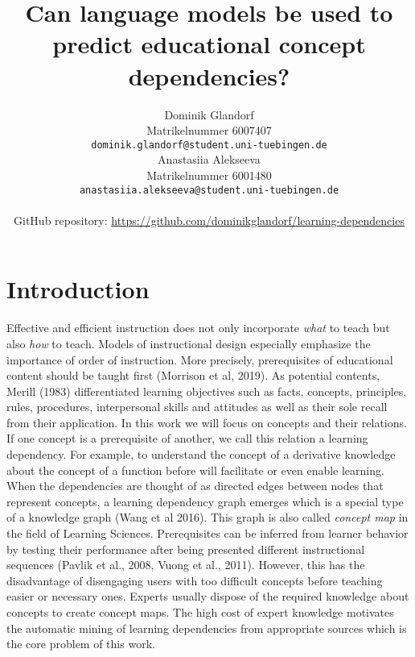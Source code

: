 \documentclass{article}
\title{Can language models be used to predict educational concept dependencies?}
\author{%
  Dominik Glandorf\\
  Matrikelnummer 6007407\\
  \texttt{dominik.glandorf@student.uni-tuebingen.de} \\
  \And
  Anastasiia Alekseeva\\
  Matrikelnummer 6001480\\
  \texttt{anastasiia.alekseeva@student.uni-tuebingen.de} \\
  \\
  GitHub repository: \url{https://github.com/dominikglandorf/learning-dependencies}
}
\begin{document}
\vspace*{-5mm}
\maketitle
\vspace*{-5mm}

\begin{abstract}





\end{abstract}

\section{Introduction}
Effective and efficient instruction does not only incorporate \textit{what} to teach but also \textit{how} to teach. Models of instructional design especially emphasize the importance of order of instruction. More precisely, prerequisites of educational content should be taught first (Morrison et al, 2019).
As potential contents, Merill (1983) differentiated learning objectives such as facts, concepts, principles, rules, procedures, interpersonal skills and attitudes as well as their sole recall from their application. In this work we will focus on concepts and their relations. 
If one concept is a prerequisite of another, we call this relation a learning dependency. For example, to understand the concept of a derivative knowledge about the concept of a function before will facilitate or even enable learning. When the dependencies are thought of as directed edges between nodes that represent concepts, a learning dependency graph emerges which is a special type of a knowledge graph (Wang et al 2016). This graph is also called \textit{concept map} in the field of Learning Sciences.
Prerequisites can be inferred from learner behavior by testing their performance after being presented different instructional sequences (Pavlik et al., 2008, Vuong et al., 2011). However, this has the disadvantage of disengaging users with too difficult concepts before teaching easier or necessary ones. Experts usually dispose of the required knowledge about concepts to create concept maps. The high cost of expert knowledge motivates the automatic mining of learning dependencies from appropriate sources which is the core problem of this work.
\end{document}
